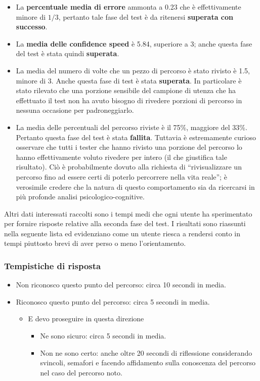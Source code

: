 \documentclass[12pt,a4paper,openright, notitlepage]{report}
\begin{document}
\begin{itemize}
	\item La \textbf{percentuale media di errore} ammonta a 0.23 che è effettivamente minore di $1/3$, pertanto tale fase del test è da ritenersi \textbf{superata con successo}.
	\item La \textbf{media delle confidence speed} è 5.84, superiore a 3; anche questa fase del test è stata quindi \textbf{superata}.
	\item La media del numero di volte che un pezzo di percorso è stato rivisto è 1.5, minore di 3. Anche questa fase di test è stata \textbf{superata}. In particolare è stato rilevato che una porzione sensibile del campione di utenza che ha effettuato il test non ha avuto bisogno di rivedere porzioni di percorso in nessuna occasione per padroneggiarlo.
	\item La media delle percentuali del percorso riviste è il 75\%, maggiore del 33\%. Pertanto questa fase del test è stata \textbf{fallita}. Tuttavia è estremamente curioso osservare che tutti i tester che hanno rivisto una porzione del percorso lo hanno effettivamente voluto rivedere per intero (il che giustifica tale risultato). Ciò è probabilmente dovuto alla richiesta di ``rivisualizzare un percorso fino ad essere certi di poterlo percorrere nella vita reale''; è verosimile credere che la natura di questo comportamento sia da ricercarsi in più profonde analisi psicologico-cognitive.
\end{itemize}

Altri dati interessati raccolti sono i tempi medi che ogni utente ha sperimentato per fornire risposte relative alla seconda fase del test. I risultati sono riassunti nella seguente lista ed evidenziano come un utente riesca a rendersi conto in tempi piuttosto brevi di aver perso o meno l’orientamento.

\subsubsection{Tempistiche di risposta}

\begin{itemize}
	\item Non riconosco questo punto del percorso: circa 10 secondi in media.
	\item Riconosco questo punto del percorso: circa 5 secondi in media.
	\begin{itemize}
		\item E devo proseguire in questa direzione
		\begin{itemize}
			\item Ne sono sicuro: circa 5 secondi in media.
			\item Non ne sono certo: anche oltre 20 secondi di riflessione considerando svincoli, semafori e facendo affidamento sulla conoscenza del percorso nel caso del percorso noto.
		\end{itemize}
	\end{itemize}
\end{itemize}
\end{document}
